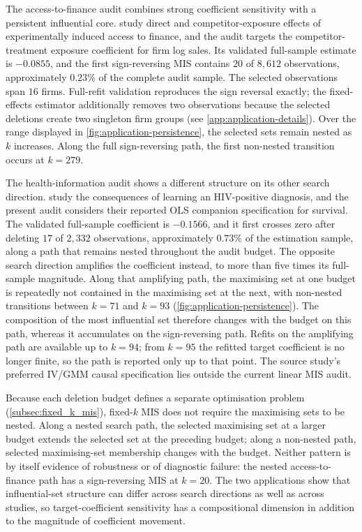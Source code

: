 \documentclass[../main.tex]{subfiles}
\begin{document}
The access-to-finance audit combines strong coefficient sensitivity with a persistent influential core. \textcite{cai2024indirect} study direct and competitor-exposure effects of experimentally induced access to finance, and the audit targets the competitor-treatment exposure coefficient for firm log sales. Its validated full-sample estimate is \(-0.0855\), and the first sign-reversing MIS contains \(20\) of \(8{,}612\) observations, approximately \(0.23\%\) of the complete audit sample. The selected observations span \(16\) firms. Full-refit validation reproduces the sign reversal exactly; the fixed-effects estimator additionally removes two observations because the selected deletions create two singleton firm groups (see \autoref{app:application-details}). Over the range displayed in \autoref{fig:application-persistence}, the selected sets remain nested as \(k\) increases. Along the full sign-reversing path, the first non-nested transition occurs at \(k=279\).

The health-information audit shows a different structure on its other search direction. \textcite{ciancio2025surviving} study the consequences of learning an HIV-positive diagnosis, and the present audit considers their reported OLS companion specification for survival. The validated full-sample coefficient is \(-0.1566\), and it first crosses zero after deleting \(17\) of \(2{,}332\) observations, approximately \(0.73\%\) of the estimation sample, along a path that remains nested throughout the audit budget. The opposite search direction amplifies the coefficient instead, to more than five times its full-sample magnitude. Along that amplifying path, the maximising set at one budget is repeatedly not contained in the maximising set at the next, with non-nested transitions between \(k=71\) and \(k=93\) (\autoref{fig:application-persistence}). The composition of the most influential set therefore changes with the budget on this path, whereas it accumulates on the sign-reversing path. Refits on the amplifying path are available up to \(k=94\); from \(k=95\) the refitted target coefficient is no longer finite, so the path is reported only up to that point. The source study's preferred IV/GMM causal specification lies outside the current linear MIS audit.

Because each deletion budget defines a separate optimisation problem (\autoref{subsec:fixed_k_mis}), fixed-\(k\) MIS does not require the maximising sets to be nested. Along a nested search path, the selected maximising set at a larger budget extends the selected set at the preceding budget; along a non-nested path, selected maximising-set membership changes with the budget. Neither pattern is by itself evidence of robustness or of diagnostic failure: the nested access-to-finance path has a sign-reversing MIS at \(k=20\). The two applications show that influential-set structure can differ across search directions as well as across studies, so target-coefficient sensitivity has a compositional dimension in addition to the magnitude of coefficient movement.
\end{document}
